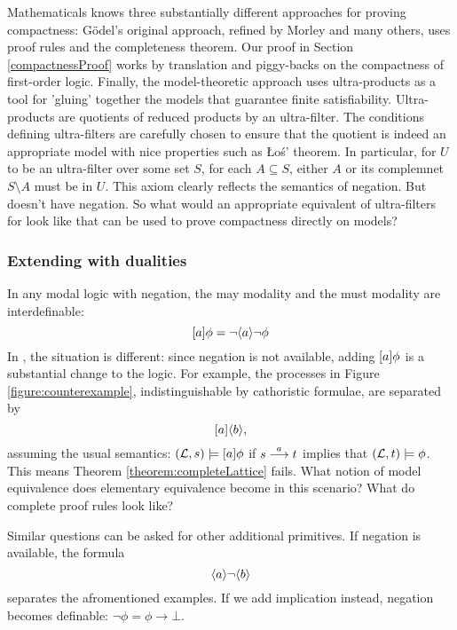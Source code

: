 Mathematicals knows three substantially different approaches for
proving compactness: G\"odel's original approach, refined by Morley
and many others, uses proof rules and the completeness theorem.  Our
proof in Section \ref{compactnessProof} works by translation and
piggy-backs on the compactness of first-order logic. Finally, the
model-theoretic approach uses ultra-products as a tool for 'gluing'
together the models that guarantee finite
satisfiability. Ultra-products are quotients of reduced products by an
ultra-filter. The conditions defining ultra-filters are carefully
chosen to ensure that the quotient is indeed an appropriate model with
nice properties such as \L{}o\'{s}' theorem. In particular, for $U$ to
be an ultra-filter over some set $S$, for each $A \subseteq S$, either
$A$ or its complemnet $S\setminus A$ must be in $U$. This axiom
clearly reflects the semantics of negation. But \cathoristic{} doesn't
have negation. So what would an appropriate equivalent of
ultra-filters for \cathoristic{} look like that can be used to prove
compactness directly on models?

\subsubsection{Extending \cathoristic{} with dualities}
In any modal logic with negation, the may modality and the must modality are interdefinable:
\[
[ a ] \phi = \neg
\langle a \rangle \neg \phi
\]
In \cathoristic{}, the situation is different: since
negation is not available, adding $[ a ] \phi$ is a substantial
change to the logic.
For example, the processes in Figure
\ref{figure:counterexample}, indistinguishable by cathoristic formulae, are
separated by
  \[
     [ a ] \langle b \rangle,
  \]
  assuming the usual semantics: $(\mathcal{L}, s) \models [ a ] \phi$ if
  $s \stackrel{a}{\longrightarrow} t$ implies that $(\mathcal{L}, t) \models \phi$. This means
  Theorem \ref{theorem:completeLattice} fails. What notion of model
  equivalence does elementary equivalence become in this scenario?
  What do complete proof rules look like?

  Similar questions can be asked for other additional primitives. If negation is 
  available, the formula
  \[
     \langle a \rangle \neg \langle b \rangle
  \]
  separates the afromentioned examples. If we add implication instead,
  negation becomes definable: $\neg \phi = \phi \rightarrow \bot$.




